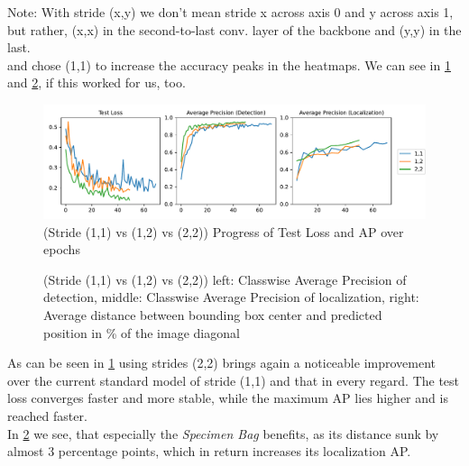 Note: With stride (x,y) we don't mean stride x across axis 0 and y across axis 1, but rather, (x,x) in the second-to-last conv. layer of the backbone and (y,y) in the last.\\

\cite{Vardazaryan} and \cite{lstm} chose (1,1) to increase the accuracy peaks in the heatmaps. We can see in \ref{fig:strides_aps} and \ref{fig:strides_distances}, if this worked for us, too.

\begin{figure}[h]
	\centering
	\includegraphics[width=15cm]{4_experiments/images/1_stride_exp/APs.pdf}
	\caption{(Stride (1,1) vs (1,2) vs (2,2)) Progress of Test Loss and AP over epochs}
	\label{fig:strides_aps}
\end{figure}

\begin{figure}[h]
	\centering
	\caption{(Stride (1,1) vs (1,2) vs (2,2)) left: Classwise Average Precision of detection, middle: Classwise Average Precision of localization, right: Average distance between bounding box center and predicted position in \% of the image diagonal}
	\label{fig:strides_distances}
\end{figure}

As can be seen in \ref{fig:strides_aps} using strides (2,2) brings again a noticeable improvement over the current standard model of stride (1,1) and that in every regard. The test loss converges faster and more stable, while the maximum AP lies higher and is reached faster.\\
In \ref{fig:strides_distances} we see, that especially the \emph{Specimen Bag} benefits, as its distance sunk by almost 3 percentage points, which in return increases its localization AP. 

